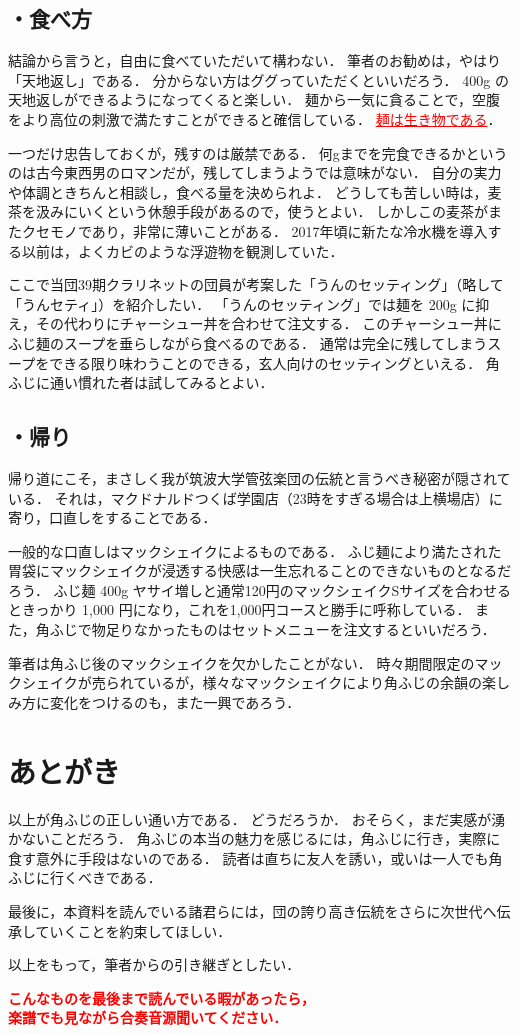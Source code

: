 \documentclass[uplatex]{jsarticle}
\begin{document}
  \subsection*{・食べ方}
  結論から言うと，自由に食べていただいて構わない．
  筆者のお勧めは，やはり「天地返し」である．
  分からない方はググっていただくといいだろう．
  400g の天地返しができるようになってくると楽しい．
  麺から一気に貪ることで，空腹をより高位の刺激で満たすことができると確信している．
  \textcolor{red}{\underline{麺は生き物である}}．

  一つだけ忠告しておくが，残すのは厳禁である．
  何gまでを完食できるかというのは古今東西男のロマンだが，残してしまうようでは意味がない．
  自分の実力や体調ときちんと相談し，食べる量を決められよ．
  どうしても苦しい時は，麦茶を汲みにいくという休憩手段があるので，使うとよい．
  しかしこの麦茶がまたクセモノであり，非常に薄いことがある．
  2017年頃に新たな冷水機を導入する以前は，よくカビのような浮遊物を観測していた．

  ここで当団39期クラリネットの団員が考案した「うんのセッティング」（略して「うんセティ」）を紹介したい．
  「うんのセッティング」では麺を 200g に抑え，その代わりにチャーシュー丼を合わせて注文する．
  このチャーシュー丼にふじ麺のスープを垂らしながら食べるのである．
  通常は完全に残してしまうスープをできる限り味わうことのできる，玄人向けのセッティングといえる．
  角ふじに通い慣れた者は試してみるとよい．


  \subsection*{・帰り}
  帰り道にこそ，まさしく我が筑波大学管弦楽団の伝統と言うべき秘密が隠されている．
  それは，マクドナルドつくば学園店（23時をすぎる場合は上横場店）に寄り，口直しをすることである．

  一般的な口直しはマックシェイクによるものである．
  ふじ麺により満たされた胃袋にマックシェイクが浸透する快感は一生忘れることのできないものとなるだろう．
  ふじ麺 400g ヤサイ増しと通常120円のマックシェイクSサイズを合わせるときっかり 1,000 円になり，これを1,000円コースと勝手に呼称している．
  また，角ふじで物足りなかったものはセットメニューを注文するといいだろう．

  筆者は角ふじ後のマックシェイクを欠かしたことがない．
  時々期間限定のマックシェイクが売られているが，様々なマックシェイクにより角ふじの余韻の楽しみ方に変化をつけるのも，また一興であろう．


 \section*{あとがき}
 以上が角ふじの正しい通い方である．
 どうだろうか．
 おそらく，まだ実感が湧かないことだろう．
 角ふじの本当の魅力を感じるには，角ふじに行き，実際に食す意外に手段はないのである．
 読者は直ちに友人を誘い，或いは一人でも角ふじに行くべきである．

 最後に，本資料を読んでいる諸君らには，団の誇り高き伝統をさらに次世代へ伝承していくことを約束してほしい．

 以上をもって，筆者からの引き継ぎとしたい．

 \newpage

 \begin{center}
  {\bf {\huge {\textcolor{red}{
  こんなものを最後まで読んでいる暇があったら，\\楽譜でも見ながら合奏音源聞いてください．
  }}}}
 \end{center}
\end{document}
